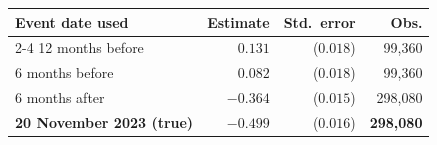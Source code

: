 \begin{tabular}{lrrr}
\toprule
Event date used & Estimate & Std.\ error & Obs. \\
\cmidrule(lr){2-4}
12 months before & $0.131$ & ($0.018$) & 99,360 \\
6 months before & $0.082$ & ($0.018$) & 99,360 \\
6 months after & $-0.364$ & ($0.015$) & 298,080 \\
\midrule
\textbf{20 November 2023 (true)} & $\mathbf{-0.499}$ & ($\mathbf{0.016}$) & \textbf{298,080} \\
\bottomrule
\end{tabular}
